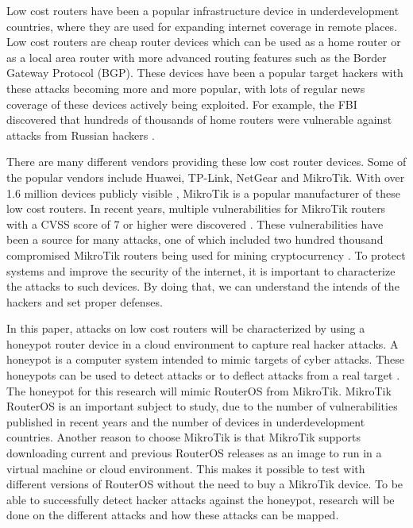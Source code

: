 Low cost routers have been a popular infrastructure device in underdevelopment countries, where they are used for expanding internet coverage in remote places. Low cost routers are cheap router devices which can be used as a home router or as a local area router with more advanced routing features such as the Border Gateway Protocol (BGP). These devices have been a popular target hackers with these attacks becoming more and more popular, with lots of regular news coverage of these devices actively being exploited. For example, the FBI discovered that hundreds of thousands of home routers were vulnerable against attacks from Russian hackers \cite{FBIRus:REUTERS:2018}.

There are many different vendors providing these low cost router devices. Some of the popular vendors include Huawei, TP-Link, NetGear and MikroTik. With over 1.6 million devices publicly visible \cite{MIKROTIK:SHODAN:2019}, MikroTik is a popular manufacturer of these low cost routers. In recent years, multiple vulnerabilities for MikroTik routers with a CVSS \cite{CVSS} score of 7 or higher were discovered \cite{CVELIST}. These vulnerabilities have been a source for many attacks, one of which included two hundred thousand compromised MikroTik routers being used for mining cryptocurrency \cite{MikroTikCryptoHack:PCMAG:2018}. To protect systems and improve the security of the internet, it is important to characterize the attacks to such devices. By doing that, we can understand the intends of the hackers and set proper defenses. 

In this paper, attacks on low cost routers will be characterized by using a honeypot router device in a cloud environment to capture real hacker attacks. A honeypot is a computer system intended to mimic targets of cyber attacks. These honeypots can be used to detect attacks or to deflect attacks from a real target \cite{HONEYPOTDEF:NORTON}. The honeypot for this research will mimic RouterOS from MikroTik. MikroTik RouterOS is an important subject to study, due to the number of vulnerabilities published in recent years and the number of devices in underdevelopment countries. Another reason to choose MikroTik is that MikroTik supports downloading current and previous RouterOS releases as an image to run in a virtual machine or cloud environment. This makes it possible to test with different versions of RouterOS without the need to buy a MikroTik device. To be able to successfully detect hacker attacks against the honeypot, research will be done on the different attacks and how these attacks can be mapped.